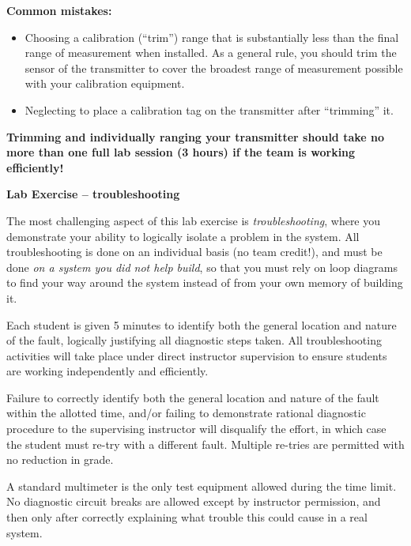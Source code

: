 \vskip 10pt

{\bf Common mistakes:}

\begin{itemize}
\item{} Choosing a calibration (``trim'') range that is substantially less than the final range of measurement when installed.  As a general rule, you should trim the sensor of the transmitter to cover the broadest range of measurement possible with your calibration equipment.
\item{} Neglecting to place a calibration tag on the transmitter after ``trimming'' it.
\end{itemize}

\vskip 10pt

{\bf Trimming and individually ranging your transmitter should take no more than one full lab session (3 hours) if the team is working efficiently!}





\vfil \eject

\noindent
{\bf Lab Exercise -- troubleshooting}

\vskip 5pt

The most challenging aspect of this lab exercise is {\it troubleshooting}, where you demonstrate your ability to logically isolate a problem in the system.  All troubleshooting is done on an individual basis (no team credit!), and must be done {\it on a system you did not help build}, so that you must rely on loop diagrams to find your way around the system instead of from your own memory of building it.

Each student is given 5 minutes to identify both the general location and nature of the fault, logically justifying all diagnostic steps taken.  All troubleshooting activities will take place under direct instructor supervision to ensure students are working independently and efficiently. 

Failure to correctly identify both the general location and nature of the fault within the allotted time, and/or failing to demonstrate rational diagnostic procedure to the supervising instructor will disqualify the effort, in which case the student must re-try with a different fault.  Multiple re-tries are permitted with no reduction in grade.

A standard multimeter is the only test equipment allowed during the time limit.  No diagnostic circuit breaks are allowed except by instructor permission, and then only after correctly explaining what trouble this could cause in a real system.  

